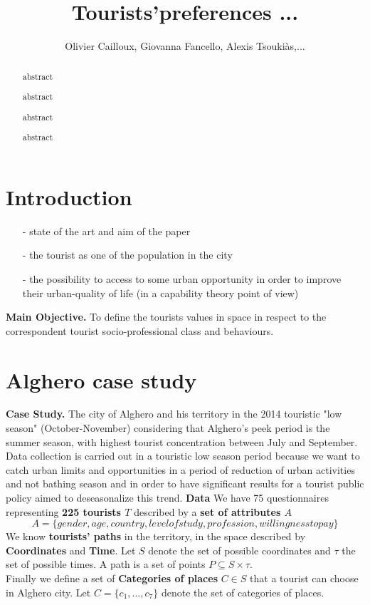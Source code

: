 \documentclass[a4paper]{article}
\author{Olivier Cailloux, Giovanna Fancello, Alexis Tsoukiàs,...}
\title{Tourists'preferences ...}
\begin{document}
\maketitle
\begin{abstract}
abstract

abstract

abstract

abstract
\end{abstract}

\tableofcontents


\section{Introduction}
\begin{itemize}
   \item [-]state of the art and aim of the paper
   \item [-]the tourist as one of the population in the city
   \item [-]the possibility to access to some urban opportunity in order to improve their urban-quality of life (in a capability theory point of view)
 \end{itemize}
\textbf{Main Objective.}
To define the tourists values in space in respect to the correspondent tourist socio-professional class and behaviours.

\section{Alghero case study}

\textbf{Case Study.}
The city of Alghero and his territory in the 2014 touristic "low season" (October-November) considering that Alghero's peek period is the summer season, with highest tourist concentration between July and September. Data collection is carried out in a touristic low season period because we want to catch urban limits and opportunities in a period of reduction of urban activities and not bathing season and in order to have significant results for a tourist public policy aimed to deseasonalize this trend.
\textbf{Data}
We have 75 questionnaires representing \textbf{225 tourists $T$} described by a \textbf{set of attributes $A$}
\begin{equation}
A=\{gender,age,country,level of study,profession,willingness to pay\}
\end{equation}
We know \textbf{tourists' paths} in the territory, in the space described by \textbf{Coordinates} and \textbf{Time}.
Let $S$ denote the set of possible coordinates and $\tau$ the set of possible times.  A path is a set of points $P \subseteq S \times \tau$.\\
Finally we define a set of \textbf{Categories of places} $C \in S$ that a tourist can choose in Alghero city.
Let $C=\{c_1, \ldots, c_7\}$ denote the set of categories of places.
\end{document}
